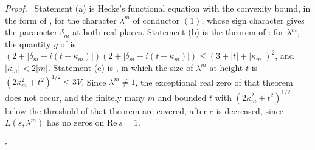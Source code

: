 \documentclass{article}
\numberwithin{equation}{section}
\newenvironment{proof}[1][Proof]{\par\medskip\noindent\textit{#1.}\ }{\hfill$\square$\par\medskip}
\newcommand{\Le}{\leqslant}
\begin{document}
\begin{proof}
Statement (a) is Hecke's functional equation with the convexity bound, in the form of \citet[(1.2.2), (1.2.3) and (1.2.8)]{duke1989some}, for the character $\lambda^m$ of conductor $(1)$, whose sign character gives the parameter $\delta_m$ at both real places. Statement (b) is the theorem of \citet[p.~227]{soehne1997upper}: for $\lambda^m$, the quantity $g$ of \citet[p.~226]{soehne1997upper} is $(2 + |\delta_m + i(t - \kappa_m)|)(2 + |\delta_m + i(t + \kappa_m)|) \Le (3 + |t| + |\kappa_m|)^2$, and $|\kappa_m| < 2|m|$. Statement (e) is \citet[Theorem~2]{coleman1990zero}, in which the size of $\lambda^m$ at height $t$ is $(2\kappa_m^2 + t^2)^{1/2} \Le 3V$. Since $\lambda^m \neq 1$, the exceptional real zero of that theorem does not occur, and the finitely many $m$ and bounded $t$ with $(2\kappa_m^2 + t^2)^{1/2}$ below the threshold of that theorem are covered, after $c$ is decreased, since $L(s, \lambda^m)$ has no zeros on $\mathrm{Re}\, s = 1$.


\end{proof}
\end{document}
